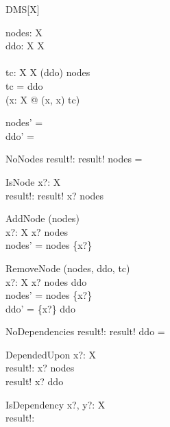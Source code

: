 \zedindent -1mm
\pagestyle{empty}
\raggedbottom

\begin{class}{DMS}[X]
\also
\begin{state}
  nodes: \finset X  \\
  ddo:  X  \rel  X  \\
  \Delta\\
  tc:  X  \rel  X  
\where
  \dom (ddo) \subseteq nodes \land \\ 
  tc = ddo\plus \land \\ 
  \lnot (\exists x:  X @ (x, x) \in tc)
\end{state}
\begin{init}
  nodes' = \emptyset \\ 
  ddo' = \emptyset
\end{init}
\begin{schema}{NoNodes}
  result!:  \bool 
\where
  result! \iff nodes = \emptyset \\ 
\end{schema}
\begin{schema}{IsNode}
  x?:  X  \\
  result!:  \bool  
\where
  result! \iff x? \in nodes
\end{schema}
\begin{schema}{AddNode}
  \Delta (nodes)\\
  x?:  X  
\where
  x? \notin nodes \\ 
  nodes' = nodes \cup \{x?\}
\end{schema}
\begin{schema}{RemoveNode}
  \Delta (nodes, ddo, tc)\\
  x?:  X  
\where
  x? \in nodes \setminus  \ran ddo \\
  nodes' = nodes \setminus \{x?\} \land \\ 
  ddo' = \{x?\} \ndres ddo
\end{schema}
\begin{schema}{NoDependencies}
  result!:  \bool  
\where
  result! \iff ddo = \emptyset
\end{schema}
\begin{schema}{DependedUpon}
  x?:  X  \\
  result!:  \bool  
\where
  x? \in nodes\\
  result! \iff x? \in  \ran ddo
\end{schema}
\begin{schema}{IsDependency}
  x?, y?:  X  \\
  result!:  \bool  

\end{schema}
\end{class}

